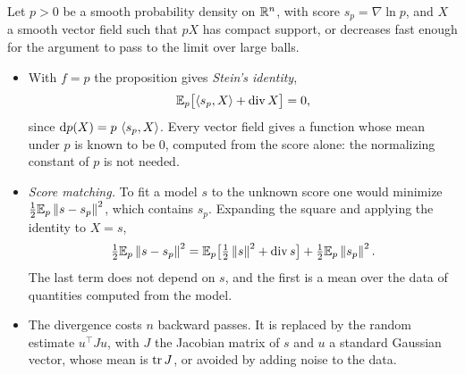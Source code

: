 \begin{notechapter}
\begin{mlthread}
Let $p > 0$ be a smooth probability density on $\mathbb{R}^n$, with score
$s_p = \nabla\ln p$, and $X$ a smooth vector field such that $pX$ has
compact support, or decreases fast enough for the argument to pass to
the limit over large balls.
\begin{itemize}[nosep]
  \item With $f = p$ the proposition gives \emph{Stein's identity},
        \[
          \mathbb{E}_p\bigl[\left\langle s_p, X \right\rangle + \operatorname{div}X\bigr] = 0 ,
        \]
        since $\mathrm{d} p(X) = p\,\left\langle s_p, X \right\rangle$. Every vector field gives a
        function whose mean under $p$ is known to be $0$, computed from
        the score alone: the normalizing constant of $p$ is not needed.
  \item \emph{Score matching.} To fit a model $s$ to the unknown score
        one would minimize $\frac12\mathbb{E}_p\left\|s - s_p\right\|^2$, which
        contains $s_p$. Expanding the square and applying the identity
        to $X = s$,
        \[
          \tfrac12\mathbb{E}_p\left\|s - s_p\right\|^2
          = \mathbb{E}_p\bigl[\tfrac12\left\|s\right\|^2 + \operatorname{div}s\bigr]
          + \tfrac12\mathbb{E}_p\left\|s_p\right\|^2 .
        \]
        The last term does not depend on $s$, and the first is a mean
        over the data of quantities computed from the model.
  \item The divergence costs $n$ backward passes. It is replaced by
        the random estimate $u^\top Ju$, with $J$ the Jacobian matrix
        of $s$ and $u$ a standard Gaussian vector, whose mean is
        $\operatorname{tr} J$, or avoided by adding noise to the data.
\end{itemize}
\end{mlthread}


\end{notechapter}
